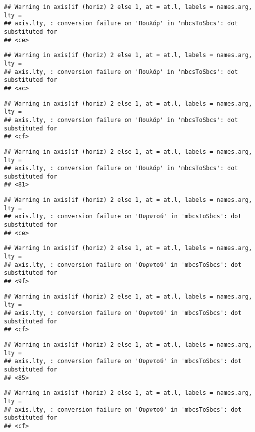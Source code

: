 \documentclass[
]{article}
\begin{document}
\begin{verbatim}
## Warning in axis(if (horiz) 2 else 1, at = at.l, labels = names.arg, lty =
## axis.lty, : conversion failure on 'Πουλάρ' in 'mbcsToSbcs': dot substituted for
## <ce>
\end{verbatim}

\begin{verbatim}
## Warning in axis(if (horiz) 2 else 1, at = at.l, labels = names.arg, lty =
## axis.lty, : conversion failure on 'Πουλάρ' in 'mbcsToSbcs': dot substituted for
## <ac>
\end{verbatim}

\begin{verbatim}
## Warning in axis(if (horiz) 2 else 1, at = at.l, labels = names.arg, lty =
## axis.lty, : conversion failure on 'Πουλάρ' in 'mbcsToSbcs': dot substituted for
## <cf>
\end{verbatim}

\begin{verbatim}
## Warning in axis(if (horiz) 2 else 1, at = at.l, labels = names.arg, lty =
## axis.lty, : conversion failure on 'Πουλάρ' in 'mbcsToSbcs': dot substituted for
## <81>
\end{verbatim}

\begin{verbatim}
## Warning in axis(if (horiz) 2 else 1, at = at.l, labels = names.arg, lty =
## axis.lty, : conversion failure on 'Ουρντού' in 'mbcsToSbcs': dot substituted for
## <ce>
\end{verbatim}

\begin{verbatim}
## Warning in axis(if (horiz) 2 else 1, at = at.l, labels = names.arg, lty =
## axis.lty, : conversion failure on 'Ουρντού' in 'mbcsToSbcs': dot substituted for
## <9f>
\end{verbatim}

\begin{verbatim}
## Warning in axis(if (horiz) 2 else 1, at = at.l, labels = names.arg, lty =
## axis.lty, : conversion failure on 'Ουρντού' in 'mbcsToSbcs': dot substituted for
## <cf>
\end{verbatim}

\begin{verbatim}
## Warning in axis(if (horiz) 2 else 1, at = at.l, labels = names.arg, lty =
## axis.lty, : conversion failure on 'Ουρντού' in 'mbcsToSbcs': dot substituted for
## <85>
\end{verbatim}

\begin{verbatim}
## Warning in axis(if (horiz) 2 else 1, at = at.l, labels = names.arg, lty =
## axis.lty, : conversion failure on 'Ουρντού' in 'mbcsToSbcs': dot substituted for
## <cf>
\end{verbatim}
\end{document}
